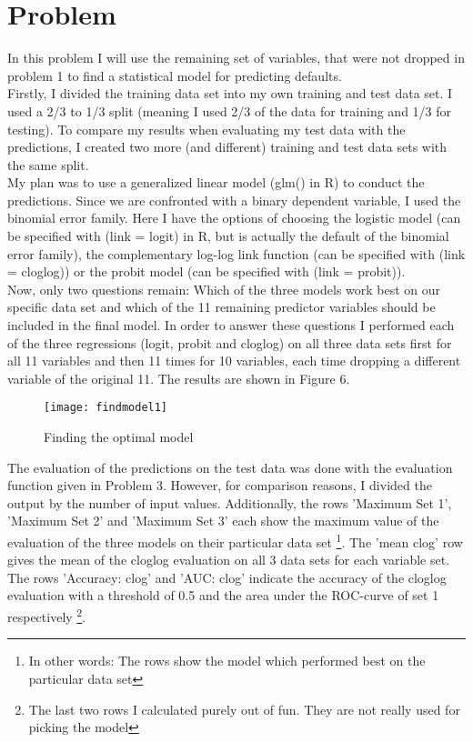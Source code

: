 \documentclass[11pt,a4paper,numbers=endperiod]{article}
\begin{document}
	\onehalfspacing
	\section{Problem}
	
	In this problem I will use the remaining set of variables, that were not dropped in problem 1 to find a statistical model for predicting defaults.\\
	Firstly, I divided the training data set into my own training and test data set. I used a 2/3 to 1/3 split (meaning I used 2/3 of the data for training and 1/3 for testing). To compare my results when evaluating my test data with the predictions, I created two more (and different) training and test data sets with the same split.\\
	My plan was to use a generalized linear model (glm() in R) to conduct the predictions. Since we are confronted with a binary dependent variable, I used the binomial error family. Here I have the options of choosing the logistic model (can be specified with (link = logit) in R, but is actually the default of the binomial error family), the complementary log-log link function (can be specified with (link = cloglog)) or the probit model (can be specified with (link = probit)).\\
	Now, only two questions remain: Which of the three models work best on our specific data set and which of the 11 remaining predictor variables should be included in the final model. In order to answer these questions I performed each of the three regressions (logit, probit and cloglog) on all three data sets first for all 11 variables and then 11 times for 10 variables, each time dropping a different variable of the original 11. The results are shown in Figure 6.
	\begin{figure}[!ht] 
		\centering
		\texttt{[image: findmodel1]}
		\caption{Finding the optimal model}
	\end{figure}
	The evaluation of the predictions on the test data was done with the evaluation function given in Problem 3. However, for comparison reasons, I divided the output by the number of input values. Additionally, the rows 'Maximum Set 1', 'Maximum Set 2' and 'Maximum Set 3' each show the maximum value of the evaluation of the three models on their particular data set \footnote{In other words: The rows show the model which performed best on the particular data set}. The 'mean clog' row gives the mean of the cloglog evaluation on all 3 data sets for each variable set. The rows 'Accuracy: clog' and 'AUC: clog' indicate the accuracy of the cloglog evaluation with a threshold of 0.5 and the area under the ROC-curve of set 1 respectively \footnote{The last two rows I calculated purely out of fun. They are not really used for picking the model}.\\
\end{document}

